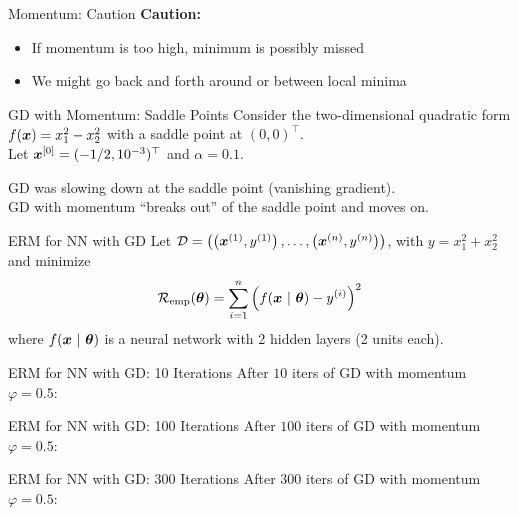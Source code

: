 \documentclass[11pt,compress,t,notes=noshow, xcolor=table]{beamer}
\begin{document}
\begin{framev}{Momentum: Caution}
\textbf{Caution:}
\begin{itemize}
\item If momentum is too high, minimum is possibly missed
\item We might go back and forth around or between local minima
\end{itemize}
\end{framev}


\begin{framev}{GD with Momentum: Saddle Points}
Consider the two-dimensional quadratic form $f(\bm{x}) = x_{1}^{2} - x_{2}^{2}$ with a saddle point at $(0, 0)^\top$.\\
\vfill
Let $\bm{x}^{[0]} = (-1/2, 10^{-3})^\top$ and $\alpha = 0.1$.
\begin{footnotesize}
GD was slowing down at the saddle point (vanishing gradient).\\
GD with momentum ``breaks out'' of the saddle point and moves on.
\end{footnotesize}
\end{framev}


\begin{framev}{ERM for NN with GD}
Let $\mathcal{D} = \left( \left(\bm{x}^{(1)}, y^{(1)}\right), \ldots, \left(\bm{x}^{(n)}, y^{(n)}\right)\right)$, with $y = x_1^2 + x_2^2$ and minimize
$$
\mathcal{R}_{\text{emp}}(\bm{\theta}) = \sum\limits_{i=1}^n \left(f(\bm{x} ~|~ \bm{\theta}) - y^{(i)}\right)^2
$$
where $f(\bm{x} ~|~ \bm{\theta})$ is a neural network with 2 hidden layers (2 units each).\\
\end{framev}


\begin{framev}[align=top]{ERM for NN with GD: 10 Iterations}
After $10$ iters of GD with momentum $\varphi = 0.5$:
\end{framev}


\begin{framev}[align=top]{ERM for NN with GD: 100 Iterations}
After $100$ iters of GD with momentum $\varphi = 0.5$:
\end{framev}


\begin{framev}[align=top]{ERM for NN with GD: 300 Iterations}
After $300$ iters of GD with momentum $\varphi = 0.5$:
\end{framev}
\end{document}
